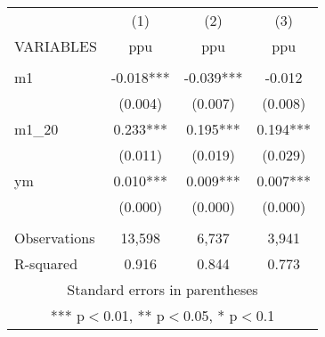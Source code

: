 \begin{tabular}{lccc} \hline
 & (1) & (2) & (3) \\
VARIABLES & ppu & ppu & ppu \\ \hline
 &  &  &  \\
m1 & -0.018*** & -0.039*** & -0.012 \\
 & (0.004) & (0.007) & (0.008) \\
m1\_20 & 0.233*** & 0.195*** & 0.194*** \\
 & (0.011) & (0.019) & (0.029) \\
ym & 0.010*** & 0.009*** & 0.007*** \\
 & (0.000) & (0.000) & (0.000) \\
 &  &  &  \\
Observations & 13,598 & 6,737 & 3,941 \\
 R-squared & 0.916 & 0.844 & 0.773 \\ \hline
\multicolumn{4}{c}{ Standard errors in parentheses} \\
\multicolumn{4}{c}{ *** p$<$0.01, ** p$<$0.05, * p$<$0.1} \\
\end{tabular}
